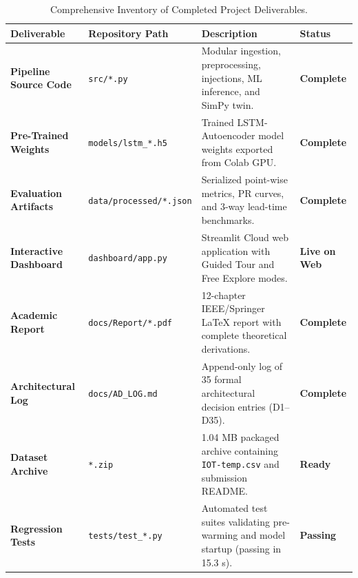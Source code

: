 \documentclass[11pt,a4paper,oneside]{article}
\begin{document}
\begin{table}[H]
\centering
\small
\renewcommand{\arraystretch}{1.2}
\begin{tabularx}{\textwidth}{L{3.2cm} L{3.5cm} Y C{2.2cm}}
\toprule
{}
\textbf{Deliverable} & \textbf{Repository Path} & \textbf{Description} & \textbf{Status} \\
\midrule
\textbf{Pipeline Source Code} & \texttt{src/*.py} & Modular ingestion, preprocessing, injections, ML inference, and SimPy twin. & \textbf{\textcolor{EmeraldGreen}{Complete}} \\
\textbf{Pre-Trained Weights}  & \texttt{models/lstm\_*.h5} & Trained LSTM-Autoencoder model weights exported from Colab GPU. & \textbf{\textcolor{EmeraldGreen}{Complete}} \\
\textbf{Evaluation Artifacts} & \texttt{data/processed/*.json} & Serialized point-wise metrics, PR curves, and 3-way lead-time benchmarks. & \textbf{\textcolor{EmeraldGreen}{Complete}} \\
\textbf{Interactive Dashboard}& \texttt{dashboard/app.py} & Streamlit Cloud web application with Guided Tour and Free Explore modes. & \textbf{\textcolor{EmeraldGreen}{Live on Web}} \\
\textbf{Academic Report}      & \texttt{docs/Report/*.pdf} & 12-chapter IEEE/Springer LaTeX report with complete theoretical derivations. & \textbf{\textcolor{EmeraldGreen}{Complete}} \\
\textbf{Architectural Log}    & \texttt{docs/AD\_LOG.md} & Append-only log of 35 formal architectural decision entries (D1--D35). & \textbf{\textcolor{EmeraldGreen}{Complete}} \\
\textbf{Dataset Archive}      & \texttt{*.zip} & 1.04 MB packaged archive containing \texttt{IOT-temp.csv} and submission README. & \textbf{\textcolor{EmeraldGreen}{Ready}} \\
\textbf{Regression Tests}     & \texttt{tests/test\_*.py} & Automated test suites validating pre-warming and model startup (passing in 15.3 s). & \textbf{\textcolor{EmeraldGreen}{Passing}} \\
\bottomrule
\end{tabularx}
\caption{Comprehensive Inventory of Completed Project Deliverables.}
\label{tab:deliverables}
\end{table}

\end{document}
